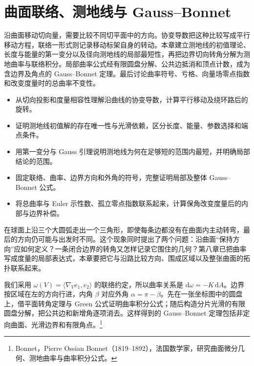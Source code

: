 
% 
% 

\chapter{曲面联络、测地线与 Gauss–Bonnet}
\label{g1:ch:09}

\begin{chapterabstract}
	沿曲面移动切向量，需要比较不同切平面中的方向。协变导数把这种比较写成平行移动方程，联络一形式则记录移动标架自身的转动。本章建立测地线的初值理论、长度与能量的第一变分以及径向测地线的局部最短性，再把边界切向转角分解为测地曲率与联络积分。局部曲率公式经有限圆盘分解、公共边抵消和顶点计数，成为含边界及角点的 Gauss--Bonnet 定理。最后讨论曲率符号、亏格、向量场零点指数和改变度量时的总曲率不变性。
\end{chapterabstract}

\begin{learninggoals}
	\begin{itemize}
		\item 从切向投影和度量相容性理解沿曲线的协变导数，计算平行移动及绕环路后的旋转。
		\item 证明测地线初值解的存在唯一性与光滑依赖，区分长度、能量、参数选择和端点条件。
		\item 用第一变分与 Gauss 引理说明测地线为何在足够短的范围内最短，并明确局部结论的范围。
		\item 固定联络、曲率、边界方向和外角的符号，完整证明局部及整体 Gauss--Bonnet 公式。
		\item 将总曲率与 Euler 示性数、孤立零点指数联系起来，计算保角改变度量后的内部与边界补偿。
	\end{itemize}
\end{learninggoals}

在球面上沿三个大圆弧走出一个三角形，即使每条边都没有在曲面内主动转弯，最后的方向仍可能与出发时不同。这个现象同时提出了两个问题：沿曲面“保持方向”应如何定义？一条闭合边界的转角又怎样记录它围住的几何？第八章已把曲率写成度量的局部表达式，本章要把它与沿路比较方向、围成区域以及整张曲面的拓扑联系起来。

\ProseParagraphBreak

我们采用 \(\omega(V)=\langle\nabla_Ve_1,e_2\rangle\) 的联络约定，所以曲率关系是 \(\mathrm{d}\omega=-K\,\mathrm{d}A\)。边界按区域在左的方向行进，内角 \(\beta\) 对应外角 \(\alpha=\pi-\beta\)。先在一张坐标图中的圆盘上，借平面转角定理与 Green 公式证明曲率积分公式；随后构造分片光滑的有限圆盘分解，把公共边和新增角逐项消去。这样得到的 Gauss--Bonnet 定理包括非定向曲面、光滑边界和有限角点。\footnote{Bonnet，Pierre Ossian Bonnet（1819--1892），法国数学家，研究曲面微分几何、测地曲率与曲率积分公式。}

